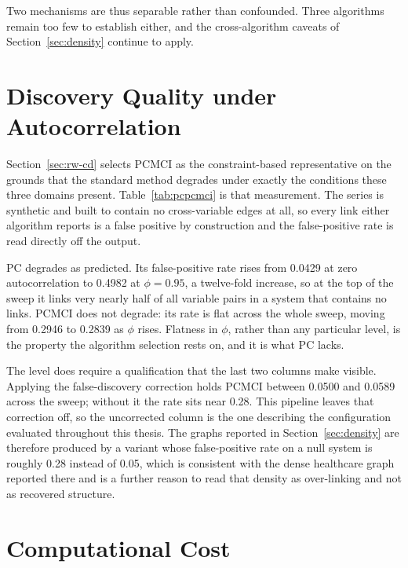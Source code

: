 

Two mechanisms are thus separable rather than confounded. Three algorithms remain too few to establish either, and the cross-algorithm caveats of Section~\ref{sec:density} continue to apply.

\section{Discovery Quality under Autocorrelation}
\label{sec:pcpcmci}

Section~\ref{sec:rw-cd} selects PCMCI as the constraint-based representative on the grounds that the standard method degrades under exactly the conditions these three domains present. Table~\ref{tab:pcpcmci} is that measurement. The series is synthetic and built to contain no cross-variable edges at all, so every link either algorithm reports is a false positive by construction and the false-positive rate is read directly off the output.

PC degrades as predicted. Its false-positive rate rises from 0.0429 at zero autocorrelation to 0.4982 at $\phi = 0.95$, a twelve-fold increase, so at the top of the sweep it links very nearly half of all variable pairs in a system that contains no links. PCMCI does not degrade: its rate is flat across the whole sweep, moving from 0.2946 to 0.2839 as $\phi$ rises. Flatness in $\phi$, rather than any particular level, is the property the algorithm selection rests on, and it is what PC lacks.

The level does require a qualification that the last two columns make visible. Applying the false-discovery correction holds PCMCI between 0.0500 and 0.0589 across the sweep; without it the rate sits near 0.28. This pipeline leaves that correction off, so the uncorrected column is the one describing the configuration evaluated throughout this thesis. The graphs reported in Section~\ref{sec:density} are therefore produced by a variant whose false-positive rate on a null system is roughly 0.28 instead of 0.05, which is consistent with the dense healthcare graph reported there and is a further reason to read that density as over-linking and not as recovered structure.



\section{Computational Cost}
\label{sec:runtime}

